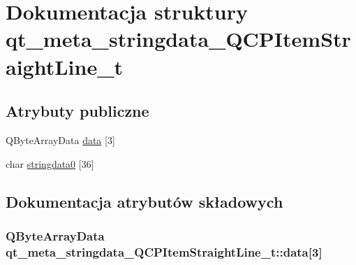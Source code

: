 \hypertarget{structqt__meta__stringdata___q_c_p_item_straight_line__t}{}\section{Dokumentacja struktury qt\+\_\+meta\+\_\+stringdata\+\_\+\+Q\+C\+P\+Item\+Straight\+Line\+\_\+t}
\label{structqt__meta__stringdata___q_c_p_item_straight_line__t}
\subsection*{Atrybuty publiczne}
\begin{DoxyCompactItemize}
\item 
Q\+Byte\+Array\+Data \hyperlink{structqt__meta__stringdata___q_c_p_item_straight_line__t_a1b24e360df4ab7c0917a94969f909ba0}{data} \mbox{[}3\mbox{]}
\item 
char \hyperlink{structqt__meta__stringdata___q_c_p_item_straight_line__t_a0e2c6dce44cbc1e13041b33cd138f25d}{stringdata0} \mbox{[}36\mbox{]}
\end{DoxyCompactItemize}


\subsection{Dokumentacja atrybutów składowych}
\subsubsection[{\texorpdfstring{data}{data}}]{\setlength{\rightskip}{0pt plus 5cm}Q\+Byte\+Array\+Data qt\+\_\+meta\+\_\+stringdata\+\_\+\+Q\+C\+P\+Item\+Straight\+Line\+\_\+t\+::data\mbox{[}3\mbox{]}}\hypertarget{structqt__meta__stringdata___q_c_p_item_straight_line__t_a1b24e360df4ab7c0917a94969f909ba0}{}\label{structqt__meta__stringdata___q_c_p_item_straight_line__t_a1b24e360df4ab7c0917a94969f909ba0}
